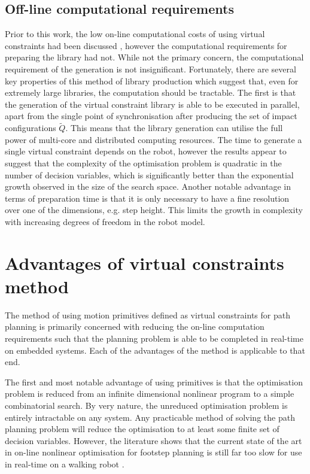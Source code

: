 \subsection{Off-line computational requirements}
Prior to this work, the low on-line computational costs of using virtual constraints had been discussed \cite{manchester13planning}, however the computational requirements for preparing the library had not. While not the primary concern, the computational requirement of the generation is not insignificant. Fortunately, there are several key properties of this method of library production which suggest that, even for extremely large libraries, the computation should be tractable. The first is that the generation of the virtual constraint library is able to be executed in parallel, apart from the single point of synchronisation after producing the set of impact configurations $\tilde{Q}$. This means that the library generation can utilise the full power of multi-core and distributed computing resources. The time to generate a single virtual constraint depends on the robot, however the results appear to suggest that the complexity of the optimisation problem is quadratic in the number of decision variables, which is significantly better than the exponential growth observed in the size of the search space. Another notable advantage in terms of preparation time is that it is only necessary to have a fine resolution over one of the dimensions, e.g. step height. This limits the growth in complexity with increasing degrees of freedom in the robot model.

\section{Advantages of virtual constraints method}
The method of using motion primitives defined as virtual constraints for path planning is primarily concerned with reducing the on-line computation requirements such that the planning problem is able to be completed in real-time on embedded systems. Each of the advantages of the method is applicable to that end.

The first and most notable advantage of using primitives is that the optimisation problem is reduced from an infinite dimensional nonlinear program to a simple combinatorial search. By very nature, the unreduced optimisation problem is entirely intractable on any system. Any practicable method of solving the path planning problem will reduce the optimisation to at least some finite set of decision variables. However, the literature shows that the current state of the art in on-line nonlinear optimisation for footstep planning is still far too slow for use in real-time on a walking robot \cite{shkolnik2011bounding}.

